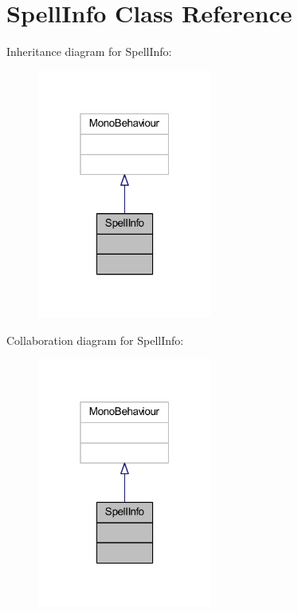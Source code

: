 \hypertarget{class_spell_info}{}\section{Spell\+Info Class Reference}
\label{class_spell_info}


Inheritance diagram for Spell\+Info\+:\nopagebreak
\begin{figure}[H]
\begin{center}
\leavevmode
\includegraphics[width=163pt]{class_spell_info__inherit__graph}
\end{center}
\end{figure}


Collaboration diagram for Spell\+Info\+:\nopagebreak
\begin{figure}[H]
\begin{center}
\leavevmode
\includegraphics[width=163pt]{class_spell_info__coll__graph}
\end{center}
\end{figure}

